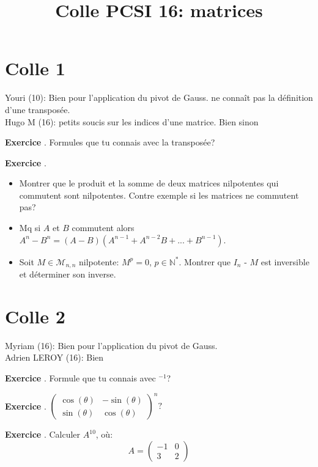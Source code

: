 \documentclass[10pt,a4paper]{article}
\title{Colle PCSI 16: matrices}
\newcounter{question}
\newcounter{exo}
\newenvironment{exo}{\vspace{0.5cm}\setcounter{question}{0}\addtocounter{exo}{1} \noindent \textbf{Exercice \theexo}. \normalsize }{\par}
\begin{document}
	\maketitle
\section*{Colle 1}
\setcounter{exo}{0}
	Youri (10): Bien pour l'application du pivot de Gauss. ne connaît pas la définition d'une transposée.\\
	Hugo M (16): petits soucis sur les indices d'une matrice. Bien sinon
	
	\begin{exo}
		Formules que tu connais avec la transposée?
	\end{exo}
	
	\begin{exo}
		\begin{itemize}
			\item Montrer que le produit et la somme de deux matrices nilpotentes qui commutent sont nilpotentes. Contre exemple si les matrices ne commutent pas?
			\item Mq si $A$ et $B$ commutent alors $A^n - B^n = (A - B)(A^{n-1} + A^{n-2}B + ... + B^{n-1})$.
			\item Soit $M \in \mathcal{M}_{n, n}$ nilpotente: $M^p = 0$, $p \in \mathbb{N}^*$. Montrer que $I_n$ - $M$ est inversible et déterminer son inverse.
		\end{itemize}
	\end{exo}

	\section*{Colle 2}
	Myriam (16): Bien pour l'application du pivot de Gauss.\\
	Adrien LEROY (16): Bien\\
	\begin{exo}
		Formule que tu connais avec ${}^{-1}$?
	\end{exo}
		
	\begin{exo}
		$\begin{pmatrix}
		\cos(\theta) & -\sin(\theta) \\ 
		\sin(\theta) & \cos(\theta)
		\end{pmatrix}^n ?$
	\end{exo}	

	\begin{exo}
		Calculer $A^{10}$, où:
		$$A = \begin{pmatrix}
		-1 & 0 \\ 
		3 & 2 
		\end{pmatrix}$$
	\end{exo}
\end{document}
